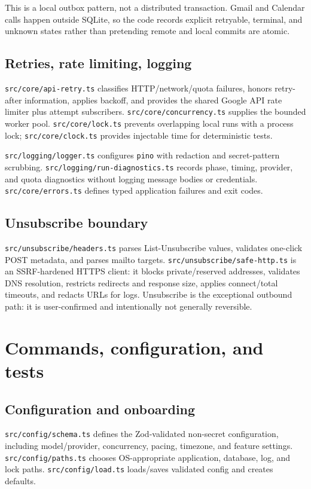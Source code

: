 \documentclass[12pt,oneside]{book}
\newcommand{\code}[1]{\nolinkurl{#1}}
\newcommand{\file}[1]{\nolinkurl{#1}}
\begin{document}
This is a local outbox pattern, not a distributed transaction. Gmail and Calendar calls happen outside SQLite, so the code records explicit retryable, terminal, and unknown states rather than pretending remote and local commits are atomic.

\section{Retries, rate limiting, logging}

\file{src/core/api-retry.ts} classifies HTTP/network/quota failures, honors retry-after information, applies backoff, and provides the shared Google API rate limiter plus attempt subscribers. \file{src/core/concurrency.ts} supplies the bounded worker pool. \file{src/core/lock.ts} prevents overlapping local runs with a process lock; \file{src/core/clock.ts} provides injectable time for deterministic tests.

\file{src/logging/logger.ts} configures \code{pino} with redaction and secret-pattern scrubbing. \file{src/logging/run-diagnostics.ts} records phase, timing, provider, and quota diagnostics without logging message bodies or credentials. \file{src/core/errors.ts} defines typed application failures and exit codes.

\section{Unsubscribe boundary}

\file{src/unsubscribe/headers.ts} parses List-Unsubscribe values, validates one-click POST metadata, and parses mailto targets. \file{src/unsubscribe/safe-http.ts} is an SSRF-hardened HTTPS client: it blocks private/reserved addresses, validates DNS resolution, restricts redirects and response size, applies connect/total timeouts, and redacts URLs for logs. Unsubscribe is the exceptional outbound path: it is user-confirmed and intentionally not generally reversible.

\chapter{Commands, configuration, and tests}

\section{Configuration and onboarding}

\file{src/config/schema.ts} defines the Zod-validated non-secret configuration, including model/provider, concurrency, pacing, timezone, and feature settings. \file{src/config/paths.ts} chooses OS-appropriate application, database, log, and lock paths. \file{src/config/load.ts} loads/saves validated config and creates defaults.
\end{document}
